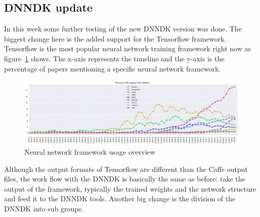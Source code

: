 \subsection{\acs{DNNDK} update}
In this week some further testing of the new \ac{DNNDK} version was done. The biggest change here is the added support for the Tensorflow framework. Tensorflow is the most popular neural network training framework right now as figure~\ref{fig:nnframeworks} shows. The x-axis represents the timeline and the y-axis is the percentage of papers mentioning a specific neural network framework.
\begin{figure}[!htb]
	\centering
		\includegraphics[width=\textwidth]{bilder/nnframeworks.jpg}
		\caption{Neural network framework usage overview \cite{frameworks}}
		\label{fig:nnframeworks}
\end{figure}
Although the output formats of Tensorflow are different than the Caffe output files, the work flow with the \ac{DNNDK} is basically the same as before: take the output of the framework, typically the trained weights and the network structure and feed it to the \ac{DNNDK} tools. Another big change is the division of the \ac{DNNDK} into sub groups.
